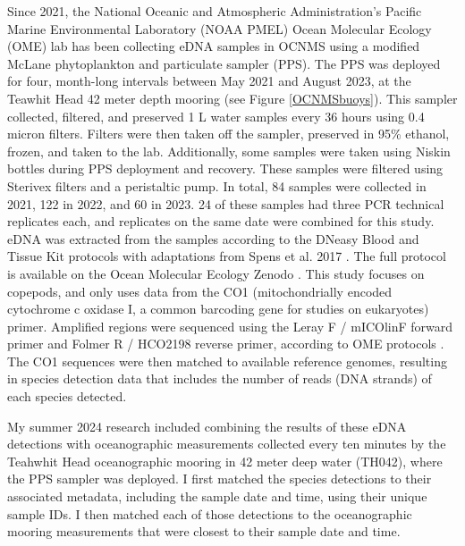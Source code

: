 \documentclass[12pt,twoside]{reedthesis}
\begin{document}
Since 2021, the National Oceanic and Atmospheric Administration's Pacific Marine Environmental Laboratory (NOAA PMEL) Ocean Molecular Ecology (OME) lab has been collecting eDNA samples in OCNMS using a modified McLane phytoplankton and particulate sampler (PPS).  The PPS was deployed for four, month-long intervals between May 2021 and August 2023, at the Teawhit Head 42 meter depth mooring (see Figure \ref{OCNMSbuoys}). This sampler collected, filtered, and preserved 1 L water samples every 36 hours using 0.4 micron filters. Filters were then taken off the sampler, preserved in 95\% ethanol, frozen, and taken to the lab. Additionally, some samples were taken using Niskin bottles during PPS deployment and recovery. These samples were filtered using Sterivex filters and a peristaltic pump. In total, 84 samples were collected in 2021, 122 in 2022, and 60 in 2023. 24 of these samples had three PCR technical replicates each, and replicates on the same date were combined for this study. eDNA was extracted from the samples according to the DNeasy Blood and Tissue Kit protocols with adaptations from Spens et al. 2017 \autocite{Spens2017}. The full protocol is available on the Ocean Molecular Ecology Zenodo \autocite{Weinrich2025}. This study focuses on copepods, and only uses data from the CO1 (mitochondrially encoded cytochrome c oxidase I, a common barcoding gene for studies on eukaryotes) primer. Amplified regions were sequenced using the  Leray F / mICOlinF forward primer and Folmer R / HCO2198 reverse primer, according to OME protocols \autocite{Gold2024, Spens2017}. The CO1 sequences were then matched to available reference genomes, resulting in species detection data that includes the number of reads (DNA strands) of each species detected.

My summer 2024 research included combining the results of these eDNA detections with oceanographic measurements collected every ten minutes by the Teahwhit Head oceanographic mooring in 42 meter deep water (TH042), where the PPS sampler was deployed. I first matched the species detections to their associated metadata, including the sample date and time, using their unique sample IDs. I then matched each of those detections to the oceanographic mooring measurements that were closest to their sample date and time.  
\end{document}
